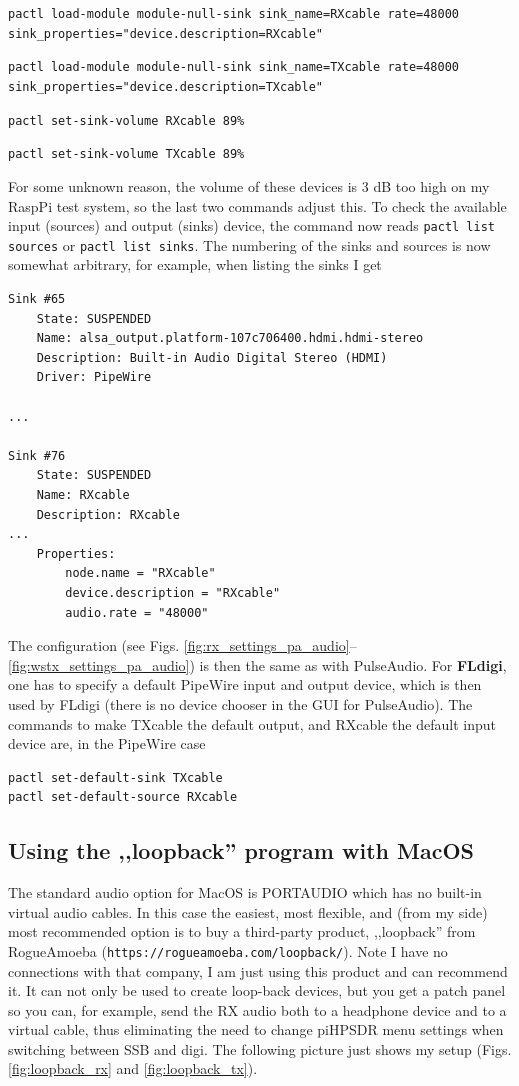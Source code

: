 \documentclass[12pt]{book}
\def\pH{pi\-HPSDR\xspace}
\begin{document}
\texttt{pactl load-module module-null-sink sink\_name=RXcable rate=48000 \\
sink\_properties="device.description=RXcable"
}

\texttt{pactl load-module module-null-sink sink\_name=TXcable rate=48000 \\
sink\_properties="device.description=TXcable"
}

\texttt{pactl set-sink-volume RXcable 89\%}

\texttt{pactl set-sink-volume TXcable 89\%}

For some unknown reason, the volume of these devices is 3 dB too high on my
RaspPi test system, so the last two commands adjust this.
To check the available input (sources) and output (sinks) device, the command
now reads \texttt{pactl list sources} or \texttt{pactl list sinks}. The numbering
of the sinks and sources is now somewhat arbitrary, for example, when listing the
sinks I get
\begin{verbatim}
Sink #65
	State: SUSPENDED
	Name: alsa_output.platform-107c706400.hdmi.hdmi-stereo
	Description: Built-in Audio Digital Stereo (HDMI)
	Driver: PipeWire

...

Sink #76
	State: SUSPENDED
	Name: RXcable
	Description: RXcable
...
	Properties:
		node.name = "RXcable"
		device.description = "RXcable"
		audio.rate = "48000"
\end{verbatim}
The configuration (see Figs. \ref{fig:rx_settings_pa_audio}--\ref{fig:wstx_settings_pa_audio}) is then the same
as with PulseAudio. For {\color{red} \textbf{FLdigi}}, one has to specify a default PipeWire input and output device, which is
then used by FLdigi (there is no device chooser in the GUI for PulseAudio). The commands to make TXcable the default output, and RXcable the default
input device are, in the PipeWire case

\begin{verbatim}
pactl set-default-sink TXcable
pactl set-default-source RXcable
\end{verbatim}

\subsection[MacOS: LoopBack]{Using the ,,loopback'' program with MacOS}
The standard audio option for MacOS is PORTAUDIO which has no built-in virtual
audio cables. In this case
the easiest, most flexible, and (from my side) most recommended option is
to buy a third-party product,  ,,loopback'' from RogueAmoeba
(\texttt{https://rogueamoeba.com/loopback/}).
Note I have no connections with that company, I am just using this product and
can recommend it. It can not only be used to create loop-back devices, but you get
a patch panel so you can, for example, send the RX audio both to a headphone device
and to a virtual cable, thus eliminating the need to change \pH menu settings
when switching between SSB and digi. The following picture just shows my setup
(Figs. \ref{fig:loopback_rx} and \ref{fig:loopback_tx}).
\end{document}
